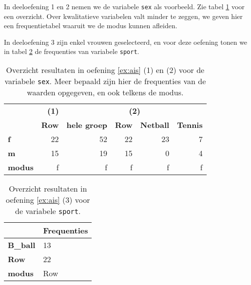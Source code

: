 In deeloefening 1 en 2 nemen we de variabele \texttt{sex} als voorbeeld. Zie tabel \ref{tab:opl-ais-sex} voor een overzicht. Over kwalitatieve variabelen valt minder te zeggen, we geven hier een frequentietabel waaruit we de modus kunnen afleiden.

In deeloefening 3 zijn enkel vrouwen geselecteerd, en voor deze oefening tonen we in tabel \ref{tab:opl-ais-sport} de frequenties van variabele \texttt{sport}.

\begin{table}
  \centering
  \begin{tabular}{@{}l|r|rrrr}
  	\toprule
  	               & \textbf{(1)} &                    \multicolumn{4}{c}{\textbf{(2)}}                     \\
  	               & \textbf{Row} & \textbf{hele groep} & \textbf{Row} & \textbf{Netball} & \textbf{Tennis} \\ \midrule
  	\textbf{f}     &           22 &                  52 &           22 &               23 &               7 \\
  	\textbf{m}     &           15 &                  19 &           15 &                0 &               4 \\
  	\textbf{modus} &            f &                   f &            f &                f &               f \\ \bottomrule
  \end{tabular}
  \caption{Overzicht resultaten in oefening \ref{ex:ais} (1) en (2) voor de variabele \texttt{sex}. Meer bepaald zijn hier de frequenties van de waarden opgegeven, en ook telkens de modus.}
  \label{tab:opl-ais-sex}
\end{table}

\begin{table}
  \centering
  \begin{tabular}{@{}l|l}
  	\toprule
  	                 & Frequenties \\ \midrule
  	\textbf{B\_ball} & 13          \\
  	\textbf{Row}     & 22          \\
  	\textbf{modus}   & Row         \\ \bottomrule
  \end{tabular}
  \caption{Overzicht resultaten in oefening \ref{ex:ais} (3) voor de variabele \texttt{sport}.}
  \label{tab:opl-ais-sport}
\end{table}